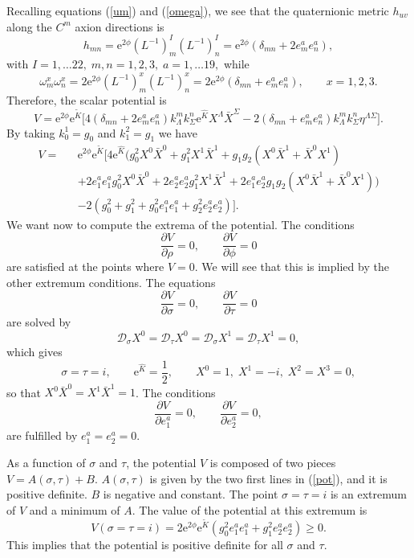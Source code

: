 \documentclass[a4paper,12pt]{article}
\begin{document}
Recalling  equations (\ref{um}) and (\ref{omega}), we see that the
quaternionic metric $h_{uv}$ along the $C^m$ axion directions is
$$h_{m n}=\mathrm{e}^{2\phi}
(L^{-1})_m^I(L^{-1})_n^I=\mathrm{e}^{2\phi}(\delta_{mn}+2e_m^ae^a_n),$$
with $ I=1,\dots 22,\; m,n=1,2,3,\; a=1,\dots 19,$ while
$$\omega_m^x\omega_n^x=2\mathrm{e}^{2\phi}
(L^{-1})_m^x(L^{-1})_n^x=2\mathrm{e}^{2\phi}(\delta_{mn}+e_m^ae^a_n),\qquad
x=1,2,3.
$$
Therefore, the scalar potential is
$$V=\mathrm{e}^{2\phi}\mathrm{e}^{\tilde
K}\bigl[4(\delta_{mn}+2e_m^ae^a_n)k^m_\Lambda k^n_\Sigma
\mathrm{e}^{\hat K}X^\Lambda\bar
X^\Sigma-2(\delta_{mn}+e_m^ae^a_n)k^m_\Lambda
k^n_\Sigma\eta^{\Lambda\Sigma}\bigr].$$ By taking $k^1_0=g_0$ and
$k_1^2=g_1$ we have
\begin{eqnarray}V=&&\mathrm{e}^{2\phi}\mathrm{e}^{\tilde
K}\bigl[4\mathrm{e}^{\hat K}\bigl(g_0^2X^0\bar X^0+g_1^2X^1\bar
X^1+g_1 g_2(X^0\bar X^1+\bar X^0 X^1)
\nonumber\\&&+2e_1^ae_1^ag_0^2X^0\bar X^0+2e_2^ae_2^ag_1^2X^1\bar
X^1+2e_1^ae_2^ag_1 g_2(X^0\bar X^1+\bar X^0
X^1)\bigr)\nonumber\\&&-2(g_0^2+g_1^2+g_0^2e_1^ae^a_1+g_2^2e_2^ae^a_2)\bigr].\label{pot}\end{eqnarray}
We want now to compute the extrema of the potential. The
conditions
$$\frac {\partial V} {\partial\rho}=0, \qquad \frac {\partial V} {\partial\phi}=0$$
are satisfied at the points where $V=0$. We will see that this is
implied by the other extremum conditions. The equations
$$\frac {\partial V} {\partial\sigma}=0, \qquad \frac {\partial V} {\partial\tau}=0$$
are solved by
$$\mathcal{D}_\sigma X^0=\mathcal{D}_\tau X^0=\mathcal{D}_\sigma
X^1=\mathcal{D}_\tau X^1=0,$$ which gives
$$\sigma=\tau=i, \qquad \mathrm{e}^{\hat K}=\frac 1 2, \qquad  X^0=1,\; X^1=-i,\; X^2=X^3=0,$$
so that $X^0\bar X^0=X^1\bar X^1 =1$.  The conditions
$$\frac {\partial V}{\partial e_1^a}=0, \qquad \frac {\partial V}{\partial
e_2^a}=0,$$ are fulfilled by $e_1^a=e_2^a=0$.

As a function of $\sigma$ and $\tau$, the potential $V$ is
composed of two pieces $V=A(\sigma, \tau)+B$. $A(\sigma, \tau)$ is
given by  the two first lines in (\ref{pot}), and it  is positive
definite. $B$ is negative and  constant. The point $\sigma=\tau=i$
is an extremum of $V$ and a minimum of $A$.  The value of the
potential at this extremum is
$$V( \sigma=\tau=i)=2\mathrm{e}^{2\phi}\mathrm{e}^{\tilde
K}(g_0^2e_1^ae_1^a+g_1^2e_2^ae_2^a)\geq 0.$$ This implies that the
potential is positive definite for all $\sigma$ and $\tau$.
\end{document}
